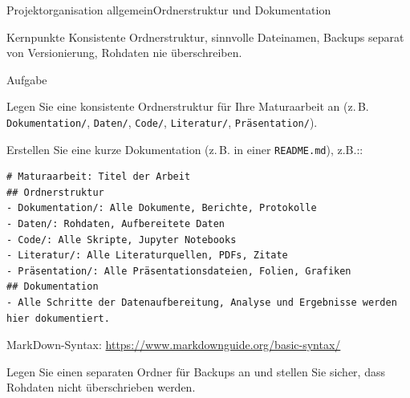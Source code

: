 \begin{frame}{Projektorganisation allgemein}{Ordnerstruktur und Dokumentation}
    \centering
    \vspace{0.6em}
    \begin{block}{Kernpunkte}
        Konsistente Ordnerstruktur, sinnvolle Dateinamen, Backups separat von Versionierung, Rohdaten nie überschreiben.
    \end{block}
    \vspace{0.4em}
\end{frame}
\begin{frame}[fragile]{Aufgabe}
    \begin{myExBox}[title=Aufgabe: Ordnerstruktur und Dokumentation anlegen]
        \scriptsize
        Legen Sie eine konsistente Ordnerstruktur für Ihre Maturaarbeit an (z.\,B. \texttt{Dokumentation/}, \texttt{Daten/}, \texttt{Code/}, \texttt{Literatur/}, \texttt{Präsentation/}).

        Erstellen Sie eine kurze Dokumentation (z.\,B. in einer \texttt{README.md}), z.B.::

        \begin{lstlisting}[style=bash, basicstyle=\color{white}\ttfamily\scriptsize, breaklines=true]
# Maturaarbeit: Titel der Arbeit
## Ordnerstruktur
- Dokumentation/: Alle Dokumente, Berichte, Protokolle
- Daten/: Rohdaten, Aufbereitete Daten
- Code/: Alle Skripte, Jupyter Notebooks
- Literatur/: Alle Literaturquellen, PDFs, Zitate
- Präsentation/: Alle Präsentationsdateien, Folien, Grafiken
## Dokumentation
- Alle Schritte der Datenaufbereitung, Analyse und Ergebnisse werden hier dokumentiert.
        \end{lstlisting}
        MarkDown-Syntax: \url{https://www.markdownguide.org/basic-syntax/}

        Legen Sie einen separaten Ordner für Backups an und stellen Sie sicher, dass Rohdaten nicht überschrieben werden.
    \end{myExBox}
\end{frame}

